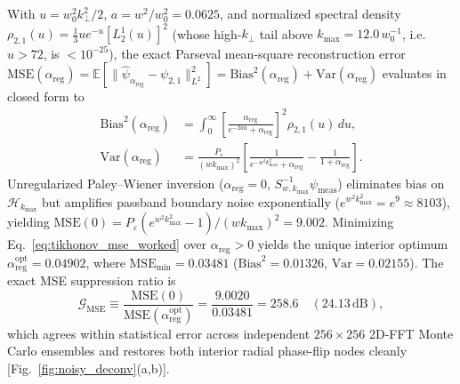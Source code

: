 \documentclass[aps,pra,onecolumn,notitlepage,11pt,tightenlines,nofootinbib,floatfix,longbibliography]{revtex4-2}
\newcommand{\norm}[1]{\lVert #1 \rVert}
\begin{document}
With $u = w_0^2 k_\perp^2/2$, $a = w^2/w_0^2 = 0.0625$, and normalized spectral density $\rho_{2,1}(u) = \frac{1}{3}u e^{-u}[L_2^1(u)]^2$ (whose high-$k_\perp$ tail above $k_{\max} = 12.0\,w_0^{-1}$, i.e.\ $u > 72$, is $< 10^{-25}$), the exact Parseval mean-square reconstruction error $\mathrm{MSE}(\alpha_{\mathrm{reg}}) = \mathbb{E}[\norm{\hat{\psi}_{\alpha_{\mathrm{reg}}} - \psi_{2,1}}_{L^2}^2] = \mathrm{Bias}^2(\alpha_{\mathrm{reg}}) + \mathrm{Var}(\alpha_{\mathrm{reg}})$ evaluates in closed form to
\begin{align}
\mathrm{Bias}^2(\alpha_{\mathrm{reg}}) &= \int_0^\infty \left[\frac{\alpha_{\mathrm{reg}}}{e^{-2au} + \alpha_{\mathrm{reg}}}\right]^2 \rho_{2,1}(u)\,du, \nonumber \\
\mathrm{Var}(\alpha_{\mathrm{reg}}) &= \frac{P_\varepsilon}{(w k_{\max})^2} \left[\frac{1}{e^{-w^2 k_{\max}^2} + \alpha_{\mathrm{reg}}} - \frac{1}{1 + \alpha_{\mathrm{reg}}}\right].
\label{eq:tikhonov_mse_worked}
\end{align}
Unregularized Paley--Wiener inversion ($\alpha_{\mathrm{reg}} = 0$, $S_{w,k_{\max}}^{-1}\psi_{\mathrm{meas}}$) eliminates bias on $\mathcal{H}_{k_{\max}}$ but amplifies passband boundary noise exponentially ($e^{w^2 k_{\max}^2} = e^9 \approx 8103$), yielding $\mathrm{MSE}(0) = P_\varepsilon(e^{w^2 k_{\max}^2} - 1)/(w k_{\max})^2 = 9.002$. Minimizing Eq.~\eqref{eq:tikhonov_mse_worked} over $\alpha_{\mathrm{reg}} > 0$ yields the unique interior optimum $\alpha_{\mathrm{reg}}^{\mathrm{opt}} = 0.04902$, where $\mathrm{MSE}_{\min} = 0.03481$ ($\mathrm{Bias}^2 = 0.01326$, $\mathrm{Var} = 0.02155$). The exact MSE suppression ratio is
\begin{equation}
\mathcal{G}_{\mathrm{MSE}} \equiv \frac{\mathrm{MSE}(0)}{\mathrm{MSE}(\alpha_{\mathrm{reg}}^{\mathrm{opt}})} = \frac{9.0020}{0.03481} = 258.6 \quad (24.13\,\mathrm{dB}),
\label{eq:mse_ratio_exact}
\end{equation}
which agrees within statistical error across independent $256\times 256$ 2D-FFT Monte Carlo ensembles and restores both interior radial phase-flip nodes cleanly [Fig.~\ref{fig:noisy_deconv}(a,b)].
\end{document}
